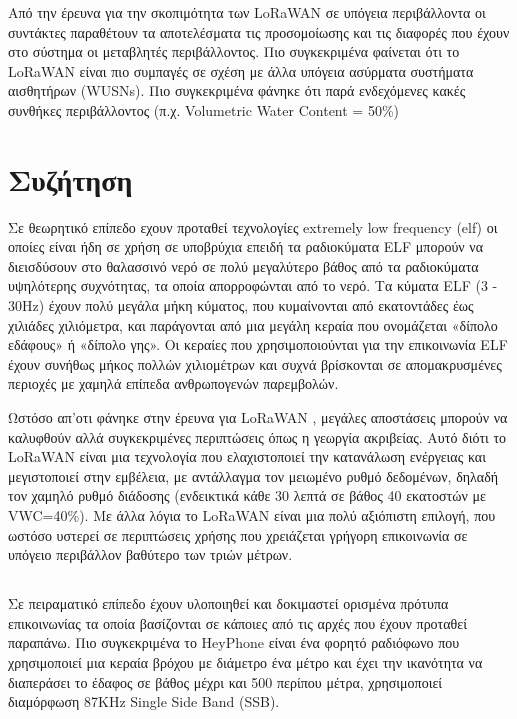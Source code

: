 \documentclass[12pt]{article}
\begin{document}
\begin{multicols*}{2}
        Από την έρευνα για την σκοπιμότητα των LoRaWAN σε υπόγεια περιβάλλοντα 
        \cite{zhao_feasibility_2023} οι συντάκτες παραθέτουν τα αποτελέσματα τις προσομοίωσης
        και τις διαφορές που έχουν στο σύστημα οι μεταβλητές περιβάλλοντος. Πιο συγκεκριμένα
        φαίνεται ότι το LoRaWAN είναι πιο συμπαγές σε σχέση με άλλα υπόγεια ασύρματα συστήματα
        αισθητήρων (WUSNs). Πιο συγκεκριμένα φάνηκε ότι παρά ενδεχόμενες κακές συνθήκες 
        περιβάλλοντος (π.χ. Volumetric Water Content = 50\%)

    \section{\normalsize  \textsf{Συζήτηση}}
        Σε θεωρητικό επίπεδο εχουν προταθεί τεχνολογίες extremely low frequency
        (elf) οι οποίες είναι ήδη σε χρήση σε υποβρύχια επειδή τα ραδιοκύματα ELF μπορούν να
        διεισδύσουν στο θαλασσινό νερό σε πολύ μεγαλύτερο βάθος από τα ραδιοκύματα υψηλότερης
        συχνότητας, τα οποία απορροφώνται από το νερό. Τα κύματα ELF (3 - 30Hz) έχουν πολύ
        μεγάλα μήκη κύματος, που κυμαίνονται από εκατοντάδες έως χιλιάδες χιλιόμετρα, και
        παράγονται από μια μεγάλη κεραία που ονομάζεται «δίπολο εδάφους» ή «δίπολο γης». Οι
        κεραίες που χρησιμοποιούνται για την επικοινωνία ELF έχουν συνήθως μήκος πολλών
        χιλιομέτρων και συχνά βρίσκονται σε απομακρυσμένες περιοχές με χαμηλά επίπεδα
        ανθρωπογενών παρεμβολών.

        Ωστόσο απ'οτι φάνηκε στην έρευνα για LoRaWAN \cite*{zhao_feasibility_2023}, μεγάλες 
        αποστάσεις μπορούν να καλυφθούν αλλά συγκεκριμένες περιπτώσεις όπως η γεωργία ακριβείας.
        Αυτό διότι το LoRaWAN είναι μια τεχνολογία που ελαχιστοποιεί την κατανάλωση ενέργειας και
        μεγιστοποιεί στην εμβέλεια, με αντάλλαγμα τον μειωμένο ρυθμό δεδομένων, δηλαδή τον χαμηλό
        ρυθμό διάδοσης (ενδεικτικά κάθε 30 λεπτά σε βάθος 40 εκατοστών με VWC=40\%). Με άλλα
        λόγια το LoRaWAN είναι μια πολύ αξιόπιστη επιλογή, που ωστόσο υστερεί σε περιπτώσεις 
        χρήσης που χρειάζεται γρήγορη επικοινωνία σε υπόγειο περιβάλλον βαθύτερο των τριών μέτρων.

    \subsection{}
        Σε πειραματικό επίπεδο έχουν υλοποιηθεί και δοκιμαστεί ορισμένα πρότυπα επικοινωνίας
        τα οποία βασίζονται σε κάποιες από τις αρχές που έχουν προταθεί παραπάνω. Πιο
        συγκεκριμένα το HeyPhone είναι ένα φορητό ραδιόφωνο που χρησιμοποιεί μια κεραία βρόχου
        με διάμετρο ένα μέτρο και έχει την ικανότητα να διαπεράσει το έδαφος σε βάθος μέχρι
        και 500 περίπου μέτρα, χρησιμοποιεί διαμόρφωση 87KHz Single Side Band (SSB).


\end{multicols*}
\end{document}
